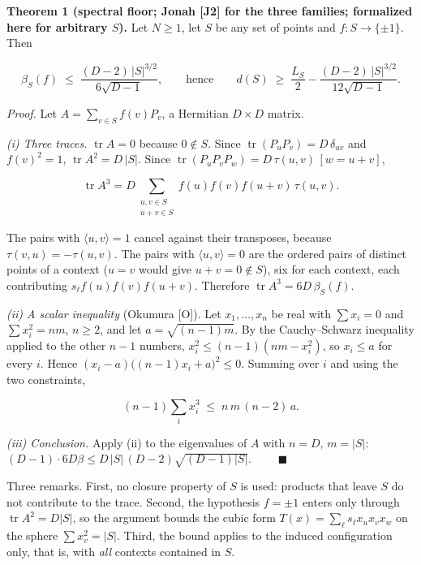 \documentclass[11pt,a4paper]{article}
\begin{document}
\textbf{Theorem 1 (spectral floor; Jonah {[}J2{]} for the three families; formalized here for arbitrary \(S\)).}
Let \(N \ge 1\), let \(S\) be any set of points and \(f : S \to \{\pm 1\}\). Then

\[\beta_S(f) \;\le\; \frac{(D-2)\,|S|^{3/2}}{6\sqrt{D-1}},
\qquad\text{hence}\qquad
d(S) \;\ge\; \frac{L_S}{2} - \frac{(D-2)\,|S|^{3/2}}{12\sqrt{D-1}} .\]

\emph{Proof.} Let \(A = \sum_{v \in S} f(v) P_v\), a Hermitian \(D \times D\) matrix.

\emph{(i) Three traces.} \(\operatorname{tr} A = 0\) because \(0 \notin S\). Since
\(\operatorname{tr}(P_u P_v) = D\,\delta_{uv}\) and \(f(v)^2 = 1\), \(\operatorname{tr} A^2 = D\,|S|\). Since
\(\operatorname{tr}(P_u P_v P_w) = D\,\tau(u,v)\,[w = u+v]\),

\[\operatorname{tr} A^3 = D \sum_{\substack{u, v \in S \\ u+v \in S}} f(u) f(v) f(u+v)\, \tau(u,v).\]

The pairs with \(\langle u,v\rangle = 1\) cancel against their transposes, because \(\tau(v,u) = -\tau(u,v)\).
The pairs with \(\langle u,v \rangle = 0\) are the ordered pairs of distinct points of a context
(\(u = v\) would give \(u + v = 0 \notin S\)), six for each context, each contributing \(s_\ell f(u)f(v)f(u+v)\).
Therefore \(\operatorname{tr} A^3 = 6 D\, \beta_S(f)\).

\emph{(ii) A scalar inequality} (Okumura {[}O{]}). Let \(x_1, \dots, x_n\) be real with \(\sum x_i = 0\) and
\(\sum x_i^2 = n m\), \(n \ge 2\), and let \(a = \sqrt{(n-1)m}\). By the Cauchy--Schwarz inequality applied to
the other \(n-1\) numbers, \(x_i^2 \le (n-1)(nm - x_i^2)\), so \(x_i \le a\) for every \(i\). Hence
\((x_i - a)\big((n-1)x_i + a\big)^2 \le 0\). Summing over \(i\) and using the two constraints,

\[(n-1) \sum_i x_i^3 \;\le\; n\, m\, (n-2)\, a .\]

\emph{(iii) Conclusion.} Apply (ii) to the eigenvalues of \(A\) with \(n = D\), \(m = |S|\):
\((D-1) \cdot 6 D \beta \le D\,|S|\,(D-2)\sqrt{(D-1)|S|}\). \(\qquad\blacksquare\)

Three remarks. First, no closure property of \(S\) is used: products that leave \(S\) do not contribute to
the trace. Second, the hypothesis \(f = \pm 1\) enters only through \(\operatorname{tr} A^2 = D|S|\), so the
argument bounds the cubic form \(T(x) = \sum_\ell s_\ell x_u x_v x_w\) on the sphere \(\sum x_v^2 = |S|\).
Third, the bound applies to the induced configuration only, that is, with \emph{all} contexts contained
in \(S\).
\end{document}
